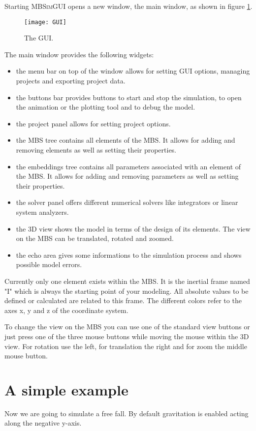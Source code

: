 \documentclass[
a4paper,
fleqn,
DIV=15,
pagesize
]{scrartcl}
\begin{document}
Starting \textsc{MBSimGUI} opens a new window, the main window, as shown in figure \ref{GUI}.
\begin{figure}
\centering
\texttt{[image: GUI]}
\caption{The GUI.} \label{GUI}
\end{figure}
The main window provides the following widgets:
\begin{itemize}
  \item the menu bar on top of the window allows for setting GUI options, managing
  projects and exporting project data.
  \item the buttons bar provides buttons to start and stop the simulation, to open
  the animation or the plotting tool and to debug the model.
  \item the project panel allows for setting project options.
  \item the MBS tree contains all elements of the MBS.
  It allows for adding and removing elements as well as setting their properties.
  \item the embeddings tree contains all parameters associated with an element of
  the MBS. It allows for adding and removing parameters as well as setting their
  properties.
  \item the solver panel offers different numerical solvers like integrators or
  linear system analyzers.
  \item the 3D view shows the model in terms of the design of its elements. The
  view on the MBS can be translated, rotated and zoomed.
  \item the echo area gives some informations to the simulation process and shows
  possible model errors.
\end{itemize}

Currently only one element exists within the MBS. It is the inertial frame named
"I" which is always the starting point of your modeling. All absolute values to
be defined or calculated are related to this frame. The different colors refer
to the axes {\color{red} x}, {\color{green} y} and {\color{blue} z} of the
coordinate system.

To change the view on the MBS you can use one of the standard view buttons or
just press one of the three mouse buttons while moving the mouse within the 3D
view. For rotation use the left, for translation the right and for zoom the
middle mouse button.

\section{A simple example}
Now we are going to simulate a free fall. By default gravitation is enabled
acting along the negative {\color{green}y-axis}.
\end{document}

